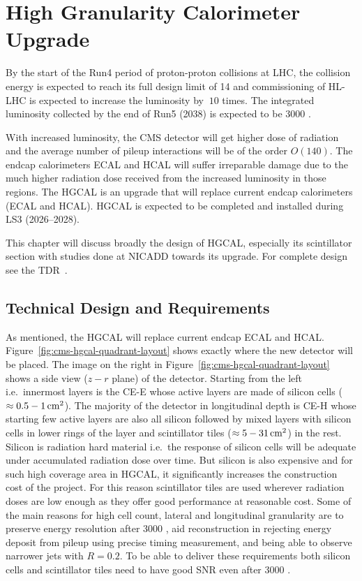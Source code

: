 \chapter{
  High Granularity Calorimeter Upgrade
 }\label{ch_hgcal}

By the start of the Run4 period of proton-proton collisions
at \gls{LHC}, the collision energy is expected to
reach its full design limit of 14 \TeV{} and
commissioning of \gls{HL-LHC} is expected to
increase the luminosity by \(~10\) times.
The integrated luminosity collected by the end of Run5 (2038)
is expected to be 3000 \fbinv{}.

With increased luminosity, the \gls{CMS} detector will get
higher dose of radiation and the average number of pileup interactions
will be of the order \( O(140) \). The endcap calorimeters \gls{ECAL} and \gls{HCAL} will suffer
irreparable damage due to the much higher radiation dose received
from the increased luminosity in those regions.
The \gls{HGCAL} is an upgrade that will replace current endcap calorimeters
(\gls{ECAL} and \gls{HCAL}).
\gls{HGCAL} is expected to be completed and installed
during \gls{LS3} (2026--2028).

This chapter will discuss broadly the design
of \gls{HGCAL}, especially its scintillator section with
studies done at \gls{NICADD} towards its upgrade.
For complete design see the \gls{TDR}~\cite{cms-hgcal-tdr}.

\section{
  Technical Design and Requirements
 }\label{ch_hgcal:technical-design}

As mentioned, the \gls{HGCAL} will replace current endcap \gls{ECAL} and
\gls{HCAL}. Figure~\ref{fig:cms-hgcal-quadrant-layout}
shows exactly where the new detector will be placed. The image on the right in
Figure~\ref{fig:cms-hgcal-quadrant-layout} shows a side view (\( z-r \) plane)
of the detector. Starting from the left i.e.~innermost layers is the
\gls{CE-E} whose active layers are made of silicon cells
(\( \approx 0.5-1 \,\text{cm}{}^2\)). The
majority of the detector in longitudinal depth is \gls{CE-H}
whose starting few active layers are also all silicon followed
by mixed layers with silicon cells in lower rings of the
layer and scintillator tiles (\( \approx 5-31 \,\text{cm}{}^2\)) in the rest.
Silicon is radiation hard material i.e.~the response of silicon cells
will be adequate under accumulated radiation dose over time. But
silicon is also expensive and for such high coverage area in \gls{HGCAL},
it significantly increases the construction cost of the project. For this
reason scintillator tiles are used wherever radiation doses are low
enough as they offer good performance at reasonable cost.
Some of the main reasons for high cell count, lateral and longitudinal granularity
are to preserve energy resolution after 3000 \fbinv{}, aid 
reconstruction in rejecting energy deposit from pileup using precise timing measurement, and
being able to observe narrower jets with \( R = 0.2 \).
To be able to deliver these requirements both silicon cells and scintillator tiles
need to have good \gls{SNR} even after 3000 \fbinv{}.

